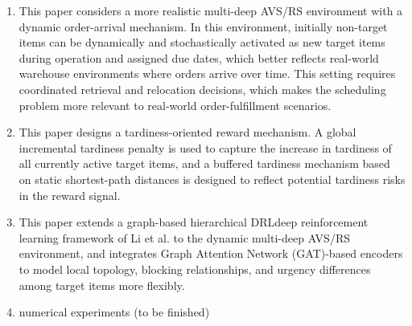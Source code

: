 \begin{enumerate}
    \item This paper considers a more realistic multi-deep AVS/RS environment with a dynamic order-arrival mechanism. In this environment, initially non-target items can be dynamically and stochastically activated as new target items during operation and assigned due dates, which better reflects real-world warehouse environments where orders arrive over time. This setting requires coordinated retrieval and relocation decisions, which makes the scheduling problem more relevant to real-world order-fulfillment scenarios.

    \item This paper designs a tardiness-oriented reward mechanism. A global incremental tardiness penalty is used to capture the increase in tardiness of all currently active target items, and a buffered tardiness mechanism based on static shortest-path distances is designed to reflect potential tardiness risks in the reward signal.

    \item This paper extends a graph-based hierarchical DRLdeep reinforcement learning framework of Li et al. \cite{Li2025} to the dynamic multi-deep AVS/RS environment, and integrates Graph Attention Network (GAT)-based encoders to model local topology, blocking relationships, and urgency differences among target items more flexibly.
    
    \item  numerical experiments (to be finished)
\end{enumerate}